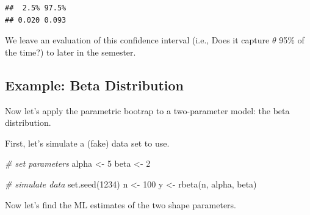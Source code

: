 \documentclass[
]{book}
\newenvironment{Shaded}{\begin{snugshade}}{\end{snugshade}}
\newcommand{\AttributeTok}[1]{\textcolor[rgb]{0.77,0.63,0.00}{#1}}
\newcommand{\CommentTok}[1]{\textcolor[rgb]{0.56,0.35,0.01}{\textit{#1}}}
\newcommand{\ConstantTok}[1]{\textcolor[rgb]{0.00,0.00,0.00}{#1}}
\newcommand{\ControlFlowTok}[1]{\textcolor[rgb]{0.13,0.29,0.53}{\textbf{#1}}}
\newcommand{\DecValTok}[1]{\textcolor[rgb]{0.00,0.00,0.81}{#1}}
\newcommand{\FunctionTok}[1]{\textcolor[rgb]{0.00,0.00,0.00}{#1}}
\newcommand{\NormalTok}[1]{#1}
\newcommand{\OtherTok}[1]{\textcolor[rgb]{0.56,0.35,0.01}{#1}}
\newcommand{\SpecialCharTok}[1]{\textcolor[rgb]{0.00,0.00,0.00}{#1}}
\begin{document}
\begin{verbatim}
##  2.5% 97.5% 
## 0.020 0.093
\end{verbatim}

We leave an evaluation of this confidence interval (i.e., Does it capture \(\theta\) 95\% of the time?) to later in the semester.

\hypertarget{example-beta-distribution-1}{%
\subsection{Example: Beta Distribution}\label{example-beta-distribution-1}}

Now let's apply the parametric bootrap to a two-parameter model: the beta distribution.

First, let's simulate a (fake) data set to use.

\begin{Shaded}
\begin{Highlighting}[]
\CommentTok{\# set parameters}
\NormalTok{alpha }\OtherTok{\textless{}{-}} \DecValTok{5}
\NormalTok{beta }\OtherTok{\textless{}{-}} \DecValTok{2}

\CommentTok{\# simulate data}
\FunctionTok{set.seed}\NormalTok{(}\DecValTok{1234}\NormalTok{)}
\NormalTok{n }\OtherTok{\textless{}{-}} \DecValTok{100}
\NormalTok{y }\OtherTok{\textless{}{-}} \FunctionTok{rbeta}\NormalTok{(n, alpha, beta)}
\end{Highlighting}
\end{Shaded}

Now let's find the ML estimates of the two shape parameters.

\begin{Shaded}
\end{Shaded}
\end{document}
